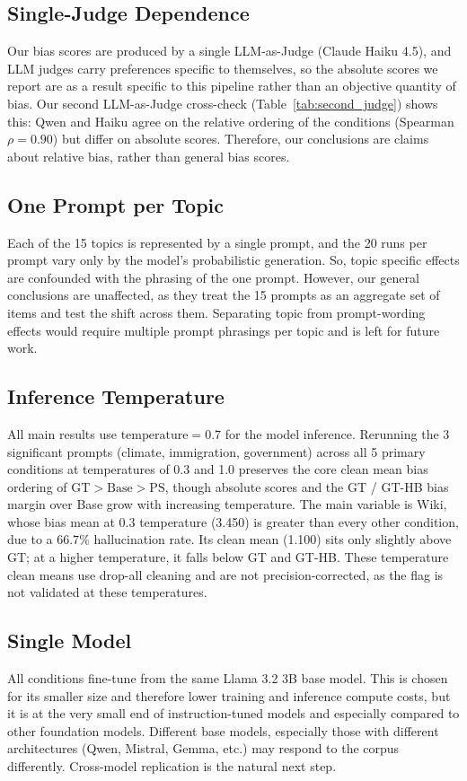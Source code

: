\documentclass[12pt]{article}
\begin{document}
\subsection{Single-Judge Dependence}
Our bias scores are produced by a single LLM-as-Judge (Claude Haiku 4.5), and LLM judges carry preferences specific to themselves, so the absolute scores we report are as a result specific to this pipeline rather than an objective quantity of bias.
Our second LLM-as-Judge cross-check (Table~\ref{tab:second_judge}) shows this: Qwen and Haiku agree on the relative ordering of the conditions (Spearman $\rho=0.90$) but differ on absolute scores.
Therefore, our conclusions are claims about relative bias, rather than general bias scores.

\subsection{One Prompt per Topic}
Each of the 15 topics is represented by a single prompt, and the 20 runs per prompt vary only by the model's probabilistic generation.
So, topic specific effects are confounded with the phrasing of the one prompt. 
However, our general conclusions are unaffected, as they treat the 15 prompts as an aggregate set of items and test the shift across them.
Separating topic from prompt-wording effects would require multiple prompt phrasings per topic and is left for future work.

\subsection{Inference Temperature}
\label{sec:inference_temperature}
All main results use $\mathrm{temperature} = 0.7$ for the model inference.
Rerunning the 3 significant prompts (climate, immigration, government) across all 5 primary conditions at temperatures of 0.3 and 1.0 preserves the core clean mean bias ordering of $\mathrm{GT} > \mathrm{Base} > \mathrm{PS}$, though absolute scores and the GT / GT-HB bias margin over Base grow with increasing temperature. 
The main variable is Wiki, whose bias mean at 0.3 temperature (3.450) is greater than every other condition, due to a $66.7\%$ hallucination rate. 
Its clean mean (1.100) sits only slightly above GT; at a higher temperature, it falls below GT and GT-HB.
These temperature clean means use drop-all cleaning and are not precision-corrected, as the flag is not validated at these temperatures.

\subsection{Single Model}
All conditions fine-tune from the same Llama 3.2 3B base model. This is chosen for its smaller size and therefore lower training and inference compute costs, but it is at the very small end of instruction-tuned models and especially compared to other foundation models. 
Different base models, especially those with different architectures (Qwen, Mistral, Gemma, etc.) may respond to the corpus differently. 
Cross-model replication is the natural next step.
\end{document}
